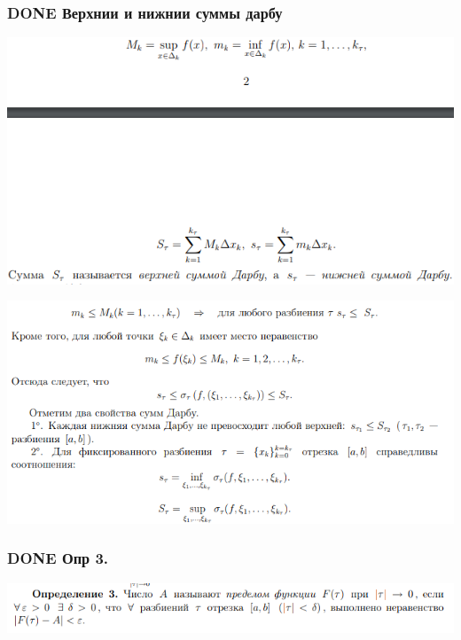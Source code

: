 \documentclass[11pt]{article}
\begin{document}
\subsubsection{{\bfseries\sffamily DONE} Верхнии и нижнии суммы дарбу}
\label{sec:orgcc79d15}
\begin{center}
\includegraphics[width=.9\linewidth]{img/b2-sumDarbu1.png}
\end{center}

\begin{center}
\includegraphics[width=.9\linewidth]{img/b2-sumDarbu2.png}
\end{center}
\subsubsection{{\bfseries\sffamily DONE} Опр 3.}
\label{sec:orgd7926eb}
\begin{center}
\includegraphics[width=.9\linewidth]{img/b2-opr3.png}
\end{center}
\end{document}
